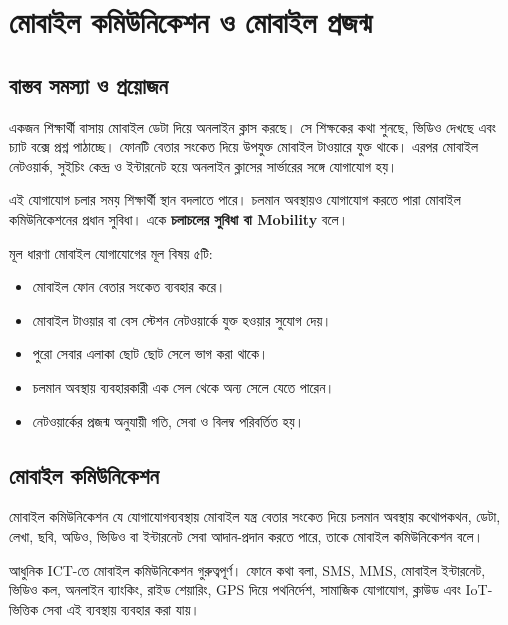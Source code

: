 \begingroup
\chTwoReadableTopicStyle
\section{মোবাইল কমিউনিকেশন ও মোবাইল প্রজন্ম}

\subsection{বাস্তব সমস্যা ও প্রয়োজন}

একজন শিক্ষার্থী বাসায় মোবাইল ডেটা দিয়ে অনলাইন ক্লাস করছে। সে শিক্ষকের কথা শুনছে, ভিডিও দেখছে এবং চ্যাট বক্সে প্রশ্ন পাঠাচ্ছে। ফোনটি বেতার সংকেত দিয়ে উপযুক্ত মোবাইল টাওয়ারে যুক্ত থাকে। এরপর মোবাইল নেটওয়ার্ক, সুইচিং কেন্দ্র ও ইন্টারনেট হয়ে অনলাইন ক্লাসের সার্ভারের সঙ্গে যোগাযোগ হয়।

এই যোগাযোগ চলার সময় শিক্ষার্থী স্থান বদলাতে পারে। চলমান অবস্থায়ও যোগাযোগ করতে পারা মোবাইল কমিউনিকেশনের প্রধান সুবিধা। একে \textbf{চলাচলের সুবিধা বা Mobility} বলে।

\begin{keypointbox}{মূল ধারণা}
মোবাইল যোগাযোগের মূল বিষয় ৫টি:
\begin{itemize}
\item মোবাইল ফোন বেতার সংকেত ব্যবহার করে।
\item মোবাইল টাওয়ার বা বেস স্টেশন নেটওয়ার্কে যুক্ত হওয়ার সুযোগ দেয়।
\item পুরো সেবার এলাকা ছোট ছোট সেলে ভাগ করা থাকে।
\item চলমান অবস্থায় ব্যবহারকারী এক সেল থেকে অন্য সেলে যেতে পারেন।
\item নেটওয়ার্কের প্রজন্ম অনুযায়ী গতি, সেবা ও বিলম্ব পরিবর্তিত হয়।
\end{itemize}
\end{keypointbox}

\subsection{মোবাইল কমিউনিকেশন}

\begin{definitionbox}{মোবাইল কমিউনিকেশন}
যে যোগাযোগব্যবস্থায় মোবাইল যন্ত্র বেতার সংকেত দিয়ে চলমান অবস্থায় কথোপকথন, ডেটা, লেখা, ছবি, অডিও, ভিডিও বা ইন্টারনেট সেবা আদান-প্রদান করতে পারে, তাকে মোবাইল কমিউনিকেশন বলে।
\end{definitionbox}

আধুনিক ICT-তে মোবাইল কমিউনিকেশন গুরুত্বপূর্ণ। ফোনে কথা বলা, SMS, MMS, মোবাইল ইন্টারনেট, ভিডিও কল, অনলাইন ব্যাংকিং, রাইড শেয়ারিং, GPS দিয়ে পথনির্দেশ, সামাজিক যোগাযোগ, ক্লাউড এবং IoT-ভিত্তিক সেবা এই ব্যবস্থায় ব্যবহার করা যায়।


